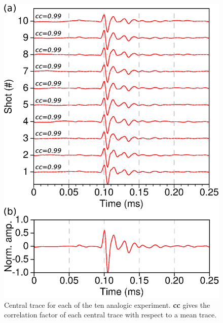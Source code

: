 \documentclass[manuscript,revised]{geophysics}
\begin{document}
\begin{figure}[!h]
	\centering
	\includegraphics[scale=0.5]{fig/musc_F50_CT.eps}
	\caption{Central trace for each of the ten analogic experiment. \textbf{cc} gives the correlation factor of each central trace with respect to a mean trace.}
	\label{panel_central_traces_cc}
\end{figure}

\end{document}
